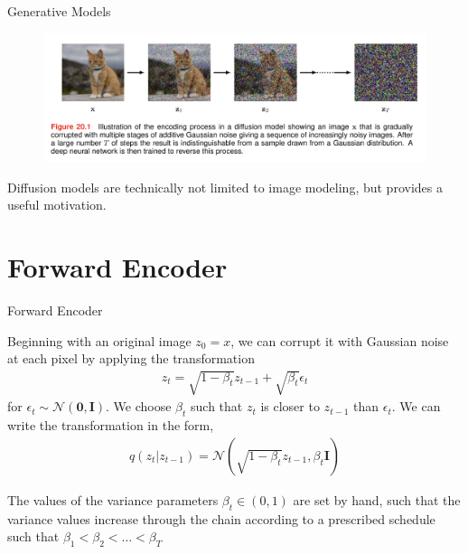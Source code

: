 \documentclass[aspectratio=169,xcolor=dvipsnames]{beamer}
\theoremstyle{named}
\begin{document}
\begin{frame}{Generative Models}

\begin{figure}[h!]
\centering
\includegraphics[width=130mm]{cat-diffusion.png}
\end{figure}

\vspace{0.5cm}

Diffusion models are technically not limited to image modeling, but provides a useful motivation.

\end{frame}

\section{Forward Encoder}

\begin{frame}{Forward Encoder}

Beginning with an original image $z_0 = x$, we can \alert{corrupt} it with Gaussian noise at each pixel by applying the transformation
\begin{align*}
    z_t = \sqrt{1 - \beta_t} z_{t-1} + \sqrt{\beta_t} \epsilon_t
\end{align*}
for $\epsilon_t \sim \mathcal{N}(\mathbf{0}, \mathbf{I})$. We choose $\beta_t$ such that $z_t$ is closer to $z_{t-1}$ than $\epsilon_t$. We can write the transformation in the form,
\begin{align*}
    q(z_t | z_{t-1}) = \mathcal{N}(\sqrt{1 - \beta_t} z_{t-1}, \beta_t \mathbf{I})
\end{align*}

The values of the variance parameters $\beta_t \in (0, 1)$ are set by hand, such that the variance values increase through the chain according to a prescribed schedule such that $\beta_1 < \beta_2 < \dots < \beta_T$

\end{frame}
\end{document}
